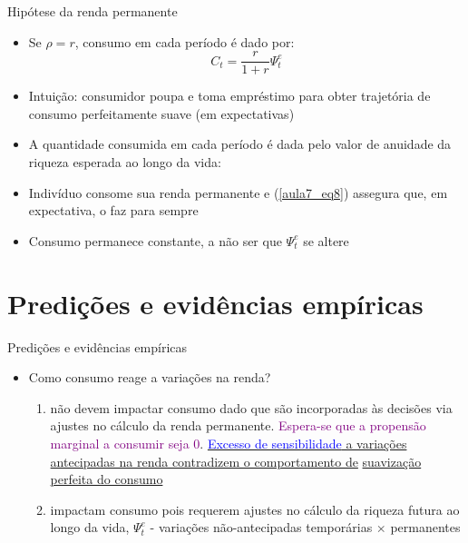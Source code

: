 \documentclass[10pt]{beamer}
\begin{document}
\begin{frame}
    {Hipótese da renda permanente}
    \begin{itemize}
        \item Se $\rho = r$, consumo em cada período é dado por:
        \begin{equation}
            C_t = \frac{r}{1 + r}\Psi_t^e\label{aula7_eq8}
        \end{equation}
        \item Intuição: consumidor poupa e toma empréstimo para obter trajetória de consumo perfeitamente suave (em expectativas)\bigskip
        \item A quantidade consumida em cada período é dada pelo valor de anuidade da riqueza esperada ao longo da vida: \bigskip
        \item Indivíduo consome sua renda permanente e (\ref{aula7_eq8}) assegura que, em expectativa, o faz para sempre\bigskip
        \item Consumo permanece constante, a não ser que $\Psi_t^e$ se altere
    \end{itemize}
\end{frame}

\section{Predições e evidências empíricas}
\begin{frame}
    {Predições e evidências empíricas}
    \begin{itemize}
        \item Como consumo reage a variações na renda?\bigskip
        \begin{enumerate}
            \item {} não devem impactar consumo dado que são incorporadas às decisões via ajustes no cálculo da renda permanente. \textcolor{purple}{Espera-se que a propensão marginal a consumir seja 0}. \underline{\textcolor{blue}{Excesso de sensibilidade} a variações antecipadas na renda contradizem o comportamento de} \newline \underline{suavização perfeita do consumo}\medskip
            \item {} impactam consumo pois requerem ajustes no cálculo da riqueza futura ao longo da vida, $\Psi_t^e$ - variações não-antecipadas temporárias $\times$ permanentes
        \end{enumerate}
    \end{itemize}
\end{frame}
\end{document}
